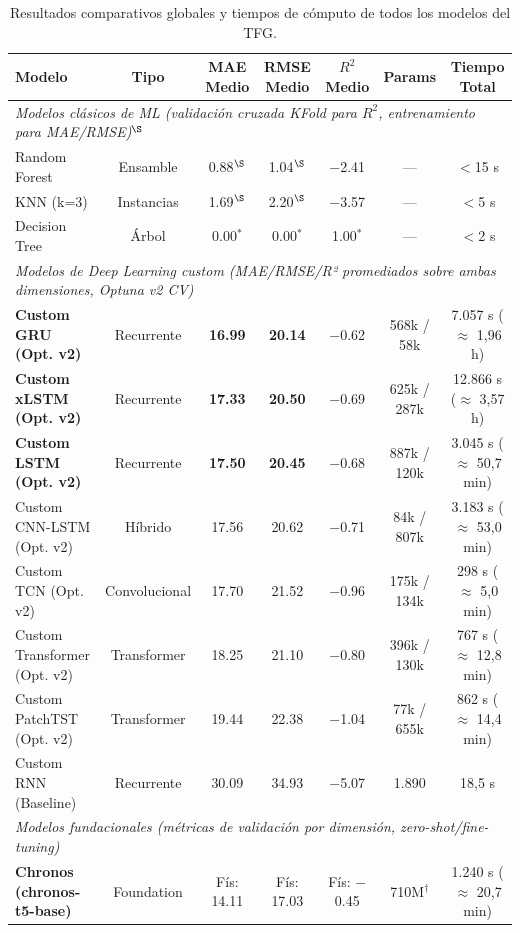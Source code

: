 \documentclass[12pt, a4paper]{article}
\begin{document}
\begin{table}[H]
\centering
\caption{Resultados comparativos globales y tiempos de cómputo de todos los modelos del TFG.}
\label{tab:resultados_globales}
\small
\begin{tabular}{@{}lcccccc@{}}
\toprule
\textbf{Modelo} & \textbf{Tipo} & \textbf{MAE Medio} & \textbf{RMSE Medio} & \textbf{$R^2$ Medio} & \textbf{Params} & \textbf{Tiempo Total} \\
\midrule
\multicolumn{7}{l}{\textit{Modelos clásicos de ML (validación cruzada KFold para $R^2$, entrenamiento para MAE/RMSE)$^\S$}} \\
Random Forest & Ensamble & 0.88$^\S$ & 1.04$^\S$ & $-$2.41 & --- & $<$15 s \\
KNN (k=3) & Instancias & 1.69$^\S$ & 2.20$^\S$ & $-$3.57 & --- & $<$5 s \\
Decision Tree & Árbol & 0.00$^*$ & 0.00$^*$ & 1.00$^*$ & --- & $<$2 s \\
\midrule
\multicolumn{7}{l}{\textit{Modelos de Deep Learning custom (MAE/RMSE/R² promediados sobre ambas dimensiones, Optuna v2 CV)}} \\
\textbf{Custom GRU (Opt. v2)} & Recurrente & \textbf{16.99} & \textbf{20.14} & $-$0.62 & 568k / 58k & 7.057 s ($\approx$ 1,96 h) \\
\textbf{Custom xLSTM (Opt. v2)} & Recurrente & \textbf{17.33} & \textbf{20.50} & $-$0.69 & 625k / 287k & 12.866 s ($\approx$ 3,57 h) \\
\textbf{Custom LSTM (Opt. v2)} & Recurrente & \textbf{17.50} & \textbf{20.45} & $-$0.68 & 887k / 120k & 3.045 s ($\approx$ 50,7 min) \\
Custom CNN-LSTM (Opt. v2) & Híbrido & 17.56 & 20.62 & $-$0.71 & 84k / 807k & 3.183 s ($\approx$ 53,0 min) \\
Custom TCN (Opt. v2) & Convolucional & 17.70 & 21.52 & $-$0.96 & 175k / 134k & 298 s ($\approx$ 5,0 min) \\
Custom Transformer (Opt. v2) & Transformer & 18.25 & 21.10 & $-$0.80 & 396k / 130k & 767 s ($\approx$ 12,8 min) \\
Custom PatchTST (Opt. v2) & Transformer & 19.44 & 22.38 & $-$1.04 & 77k / 655k & 862 s ($\approx$ 14,4 min) \\
Custom RNN (Baseline) & Recurrente & 30.09 & 34.93 & $-$5.07 & 1.890 & 18,5 s \\
\midrule
\multicolumn{7}{l}{\textit{Modelos fundacionales (métricas de validación por dimensión, zero-shot/fine-tuning)}} \\
\multirow{2}{*}{\textbf{Chronos (chronos-t5-base)}} & \multirow{2}{*}{Foundation} & Fís: 14.11 & Fís: 17.03 & Fís: $-$0.45 & \multirow{2}{*}{710M$^\dagger$} & \multirow{2}{*}{1.240 s ($\approx$ 20,7 min)} \\

\end{tabular}
\end{table}
\end{document}
